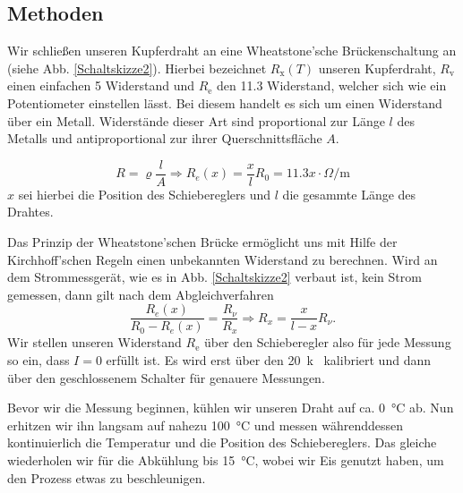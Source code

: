 \documentclass[11pt,a4paper,titlepage, ngerman]{article}
\begin{document}
		\subsection{Methoden} 
		
			Wir schließen unseren Kupferdraht an eine Wheatstone'sche Brückenschaltung an (siehe Abb. \ref{Schaltskizze2}). Hierbei bezeichnet $R_\text{x}(T)$ unseren Kupferdraht, $R_\text{v}$ einen einfachen \SI{5}{\Omega} Widerstand und $R_\text{e}$ den \SI{11,3}{\Omega} Widerstand, welcher sich wie ein Potentiometer einstellen lässt. Bei diesem handelt es sich um einen Widerstand über ein Metall. Widerstände dieser Art sind proportional zur Länge $l$ des Metalls und antiproportional zur ihrer Querschnittsfläche $A$. 
			
			\begin{equation*}
				R = \varrho \frac{l}{A} \Rightarrow R_e(x) = \frac{x}{l} R_0 = \SI{11,3} x \cdot \si{\Omega\per\meter}
			\end{equation*}				
			$x$ sei hierbei die Position des Schiebereglers und $l$ die gesammte Länge des Drahtes.	
			
			Das Prinzip der Wheatstone'schen Brücke ermöglicht uns mit Hilfe der Kirchhoff'schen Regeln einen unbekannten Widerstand zu berechnen.
			Wird an dem Strommessgerät, wie es in Abb. \ref{Schaltskizze2} verbaut ist, kein Strom gemessen, dann gilt nach dem Abgleichverfahren
			\begin{equation*}
				\frac{R_e(x)}{R_0-R_e(x)} = \frac{R_\nu}{R_x} \Rightarrow R_x = \frac{x}{l-x} R_\nu.
			\end{equation*}
			Wir stellen unseren Widerstand $R_\text{e}$ über den Schieberegler also für jede Messung so ein, dass $I = 0$ erfüllt ist. Es wird erst über den \SI{20}{k\Omega} kalibriert und dann über den geschlossenem Schalter für genauere Messungen.
			
			Bevor wir die Messung beginnen, kühlen wir unseren Draht auf ca. \SI{0}{\celsius} ab.
			Nun erhitzen wir ihn langsam auf nahezu \SI{100}{\celsius} und messen währenddessen kontinuierlich die Temperatur und die Position des Schiebereglers.
			Das gleiche wiederholen wir für die Abkühlung bis \SI{15}{\celsius}, wobei wir Eis genutzt haben, um den Prozess etwas zu beschleunigen.
						
\end{document}
